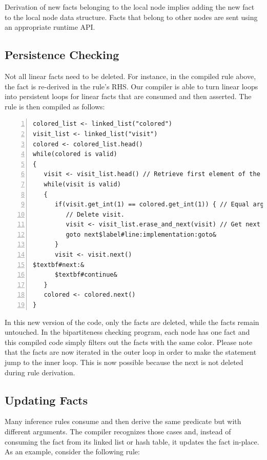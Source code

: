 Derivation of new facts belonging to the local node implies adding the new fact
to the local node data structure. Facts that belong to other nodes are sent
using an appropriate runtime API.

\subsection{Persistence Checking}

Not all linear facts need to be deleted. For instance, in the compiled rule
above, the fact  is re-derived in the rule's RHS.  Our
compiler is able to turn linear loops into persistent loops for linear facts
that are consumed and then asserted. The rule is then compiled as follows:

\begin{Verbatim}[numbers=left,fontsize=\codesize,commandchars=\$\#\&]
colored_list <- linked_list("colored")
visit_list <- linked_list("visit")
colored <- colored_list.head()
while(colored is valid)
{
   visit <- visit_list.head() // Retrieve first element of the list.
   while(visit is valid)
   {
      if(visit.get_int(1) == colored.get_int(1)) { // Equal arguments?
         // Delete visit.
         visit <- visit_list.erase_and_next(visit) // Get next visit fact.
         goto next$label#line:implementation:goto&
      }
      visit <- visit.next()
$textbf#next:&
      $textbf#continue&
   }
   colored <- colored.next()
}
\end{Verbatim}

In this new version of the code, only the  facts are deleted, while
the  facts remain untouched. In the bipartiteness checking
program, each node has one  fact and this compiled code simply
filters out the  facts with the same color. Please note that the
 facts are now iterated in the outer loop in order to make the
 statement jump to the inner loop. This is now possible because the
 next is not deleted during rule derivation.

\subsection{Updating Facts}

Many inference rules consume and then derive the same predicate but with
different arguments. The compiler recognizes those cases and, instead of
consuming the fact from its linked list or hash table, it updates the fact
in-place. As an example, consider the following rule:

